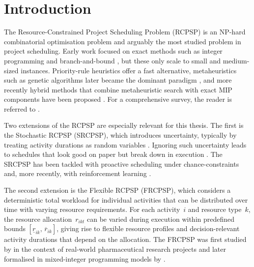 \chapter{Introduction}
\label{chap:introduction}

The Resource-Constrained Project Scheduling Problem (RCPSP) is an
NP-hard combinatorial optimisation problem
\parencite{Blazewicz1983} and arguably the most studied problem in
project scheduling. Early work focused on exact methods such as
integer programming and branch-and-bound
\parencite{Pritsker1969, Mingozzi1998, Brucker1999}, but these only
scale to small and medium-sized instances. Priority-rule heuristics
\parencite{Klein2000, Kolisch1996} offer a fast alternative,
metaheuristics such as genetic algorithms later became the dominant
paradigm \parencite{Hartmann1998, Kolisch2006a}, and more recently
hybrid methods that combine metaheuristic search with exact MIP
components have been proposed \parencite{Pellerin2020}. For a
comprehensive survey, the reader is referred to
\textcite{Hartmann2010}.

Two extensions of the RCPSP are especially relevant for this thesis.
The first is the Stochastic RCPSP (SRCPSP), which introduces
uncertainty, typically by treating activity durations as random
variables \parencite{Moehring1984}. Ignoring such uncertainty
leads to schedules that look good on paper but break down in
execution \parencite{Hartmann2010}. The SRCPSP has been tackled
with proactive scheduling under chance-constraints
\parencite{Bruni2011, Lamas2016} and, more recently, with
reinforcement learning \parencite{Sallam2021}.

The second extension is the Flexible RCPSP (FRCPSP), which considers a
deterministic total workload for individual activities that can be
distributed over time with varying resource requirements. For each
activity~$i$ and resource type~$k$, the resource allocation~$r_{ikt}$ can
be varied during execution within predefined bounds
$[\underline{r}_{ik},\, \overline{r}_{ik}]$, giving rise to flexible
resource profiles and decision-relevant activity durations that
depend on the allocation. The FRCPSP was first studied by
\textcite{Kolisch2003} in the context of real-world pharmaceutical
research projects and later formalised in mixed-integer programming models
by \textcite{Naber2014}.

